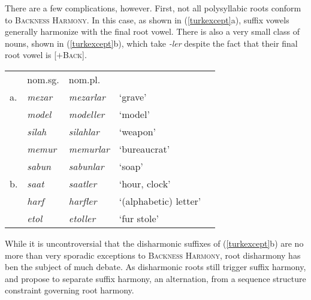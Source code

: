 There are a few complications, however. First, not all polysyllabic roots conform to \textsc{Backness Harmony}. In this case, as shown in (\ref{turkexcept}a), suffix vowels generally harmonize with the final root vowel. There is also a very small class of nouns, shown in (\ref{turkexcept}b), which take \emph{-ler} despite the fact that their final root vowel is [$+$\textsc{Back}].

\begin{example} \label{turkexcept}
\begin{tabular}{l l l l l}
   & {nom.sg.}    & {nom.pl.} \\
a. & \emph{mezar} & \emph{mezarlar} & `grave' & \citep{TELL} \\
   & \emph{model} & \emph{modeller} & `model' \\
   & \emph{silah} & \emph{silahlar} & `weapon'     \\
   & \emph{memur} & \emph{memurlar} & `bureaucrat' \\
   & \emph{sabun} & \emph{sabunlar} & `soap'       \\
b. & \emph{saat}  & \emph{saatler}  & `hour, clock' \\
   & \emph{harf}  & \emph{harfler}  & `(alphabetic) letter' \\ %
   & \emph{etol}  & \emph{etoller}  & `fur stole' \\
\end{tabular}
\end{example}

While it is uncontroversial that the disharmonic suffixes of (\ref{turkexcept}b) are no more than very sporadic exceptions to \textsc{Backness Harmony}, root disharmony has ben the subject of much debate. As disharmonic roots still trigger suffix harmony, \citet[][212, 289]{Anderson1974} and \citet{Iverson1978} propose to separate suffix harmony, an alternation, from a sequence structure constraint governing root harmony.

